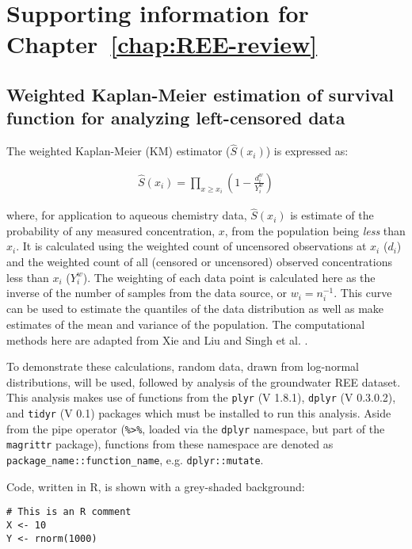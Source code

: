 \chapter{Supporting information for Chapter~\ref{chap:REE-review}}
\section{Weighted Kaplan-Meier estimation of survival function for analyzing left-censored data}

The weighted Kaplan-Meier (KM) estimator (\(\widehat{S}(x_i)\)) is expressed as:

\begin{align*}
\widehat{S}(x_i) = \prod_{x \geq x_i}\left(1 - \frac{d_i^w}{Y_i^w}\right)
\end{align*}

where, for application to aqueous chemistry data, \(\widehat{S}(x_i)\) is estimate of the probability of any measured concentration, \(x\), from the population being \emph{less} than \(x_i\).
It is calculated using the weighted count of uncensored observations at \(x_i\) (\(d_i\)) and the weighted count of all (censored or uncensored) observed concentrations less than \(x_i\) (\(Y_i^w\)).
The weighting of each data point is calculated here as the inverse of the number of samples from the data source, or \(w_i = n_i^{-1}\).
This curve can be used to estimate the quantiles of the data distribution as well as make estimates of the mean and variance of the population.
The computational methods here are adapted from Xie and Liu \citep{Xie_SiM_2005} and Singh et al. \citep{Singh_JAWMA_2013}.

To demonstrate these calculations, random data, drawn from log-normal distributions, will be used, followed by analysis of the groundwater REE dataset.
This analysis makes use of functions from the \texttt{plyr} (V 1.8.1), \texttt{dplyr} (V 0.3.0.2), and \texttt{tidyr} (V 0.1) packages which must be installed to run this analysis.
Aside from the pipe operator (\texttt{\%\textgreater{}\%}, loaded via the \texttt{dplyr} namespace, but part of the \texttt{magrittr} package), functions from these namespace are denoted as \texttt{package\_name::function\_name}, e.g. \texttt{dplyr::mutate}. 

Code, written in R, is shown with a grey-shaded background:

\begin{snugshade}
\begin{verbatim}
# This is an R comment
X <- 10
Y <- rnorm(1000)
\end{verbatim}
\end{snugshade}


